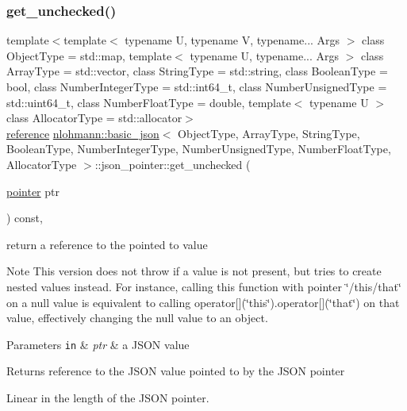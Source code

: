 \subsubsection{\texorpdfstring{get\+\_\+unchecked()}{get\_unchecked()}\hspace{0.1cm}{\footnotesize\ttfamily [1/2]}}
{\footnotesize\ttfamily template$<$template$<$ typename U, typename V, typename... Args $>$ class Object\+Type = std\+::map, template$<$ typename U, typename... Args $>$ class Array\+Type = std\+::vector, class String\+Type  = std\+::string, class Boolean\+Type  = bool, class Number\+Integer\+Type  = std\+::int64\+\_\+t, class Number\+Unsigned\+Type  = std\+::uint64\+\_\+t, class Number\+Float\+Type  = double, template$<$ typename U $>$ class Allocator\+Type = std\+::allocator$>$ \\
\hyperlink{classnlohmann_1_1basic__json_a3ec8e17be8732fe436e9d6733f52b7a3}{reference} \hyperlink{classnlohmann_1_1basic__json}{nlohmann\+::basic\+\_\+json}$<$ Object\+Type, Array\+Type, String\+Type, Boolean\+Type, Number\+Integer\+Type, Number\+Unsigned\+Type, Number\+Float\+Type, Allocator\+Type $>$\+::json\+\_\+pointer\+::get\+\_\+unchecked (\begin{DoxyParamCaption}\item[{\hyperlink{classnlohmann_1_1basic__json_a9d1b58099dc64695fcf2847ab0b2a7c7}{pointer}}]{ptr }\end{DoxyParamCaption}) const\hspace{0.3cm}{\ttfamily [inline]}, {\ttfamily [private]}}



return a reference to the pointed to value 

\begin{DoxyNote}{Note}
This version does not throw if a value is not present, but tries to create nested values instead. For instance, calling this function with pointer {\ttfamily \char`\"{}/this/that\char`\"{}} on a null value is equivalent to calling {\ttfamily operator\mbox{[}\mbox{]}(\char`\"{}this\char`\"{}).operator\mbox{[}\mbox{]}(\char`\"{}that\char`\"{})} on that value, effectively changing the null value to an object.
\end{DoxyNote}

\begin{DoxyParams}[1]{Parameters}
\mbox{\tt in}  & {\em ptr} & a J\+S\+ON value\\
\hline
\end{DoxyParams}
\begin{DoxyReturn}{Returns}
reference to the J\+S\+ON value pointed to by the J\+S\+ON pointer
\end{DoxyReturn}
Linear in the length of the J\+S\+ON pointer.


